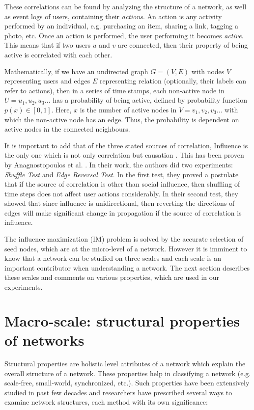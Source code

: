 	These correlations can be found by analyzing the structure of a network, as well as event logs of users, containing their \textit{actions}. An action is any activity performed by an individual, e.g. purchasing an item, sharing a link, tagging a photo, etc. Once an action is performed, the user performing it becomes \textit{active}. This means that if two users $u$ and $v$ are connected, then their property of being active is correlated with each other.
	
	Mathematically, if we have an undirected graph $G=(V,E)$ with nodes $V$ representing users and edges $E$ representing relation (optionally, their labels can refer to actions), then in a series of time stamps, each non-active node in $U={u_1,u_2,u_3\ldots}$ has a probability of being active, defined by probability function $p(x)\in [0,1]$. Here, $x$ is the number of active nodes in $V={v_1,v_2,v_3\ldots}$ with which the non-active node has an edge. Thus, the probability is dependent on active nodes in the connected neighbours.
	
	It is important to add that of the three stated sources of correlation, Influence is the only one which is not only correlation but causation \cite{mcpherson2001}. This has been proven by Anagnostopoulos et al. \cite{anagnostopoulos2008}. In their work, the authors did two experiments: \textit{Shuffle Test} and \textit{Edge Reversal Test}. In the first test, they proved a postulate that if the source of correlation is other than social influence, then shuffling of time steps does not affect user actions considerably. In their second test, they showed that since influence is unidirectional, then reverting the directions of edges will make significant change in propagation if the source of correlation is influence.
	
	The influence maximization (IM) problem is solved by the accurate selection of seed nodes, which are at the micro-level of a network. However it is imminent to know that a network can be studied on three scales and each scale is an important contributor when understanding a network. The next section describes these scales and comments on various properties, which are used in our experiments.
	
	
	\section{Macro-scale: structural properties of networks}
	\label{sec:domain-macro-scale}
	Structural properties are holistic level attributes of a network which explain the overall structure of a network. These properties help in classifying a network (e.g. scale-free, small-world, synchronized, etc.). Such properties have been extensively studied in past few decades and researchers have prescribed several ways to examine network structures, each method with its own significance:


